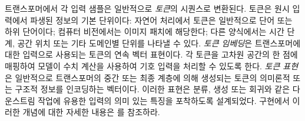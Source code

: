 \documentclass[../../book-main_ko.tex]{subfiles}
\begin{document}
\begin{remark}
    트랜스포머에서 각 입력 샘플은 일반적으로 {\em 토큰}의 시퀀스로 변환된다. 토큰은 원시 입력에서 파생된 정보의 기본 단위이다: 자연어 처리에서 토큰은 일반적으로 단어 또는 하위 단어이다; 컴퓨터 비전에서는 이미지 패치에 해당한다; 다른 양식에서는 시간 단계, 공간 위치 또는 기타 도메인별 단위를 나타낼 수 있다. {\em 토큰 임베딩}은 트랜스포머에 대한 입력으로 사용되는 토큰의 연속 벡터 표현이다. 각 토큰을 고차원 공간의 한 점에 매핑하여 모델이 수치 계산을 사용하여 기호 입력을 처리할 수 있도록 한다.
    {\em 토큰 표현}은 일반적으로 트랜스포머의 중간 또는 최종 계층에 의해 생성되는 토큰의 의미론적 또는 구조적 정보를 인코딩하는 벡터이다. 이러한 표현은 분류, 생성 또는 회귀와 같은 다운스트림 작업에 유용한 입력의 의미 있는 특징을 포착하도록 설계되었다. 구현에서 이러한 개념에 대한 자세한 내용은 를 참조하라.
\end{remark}


 
\end{document}
